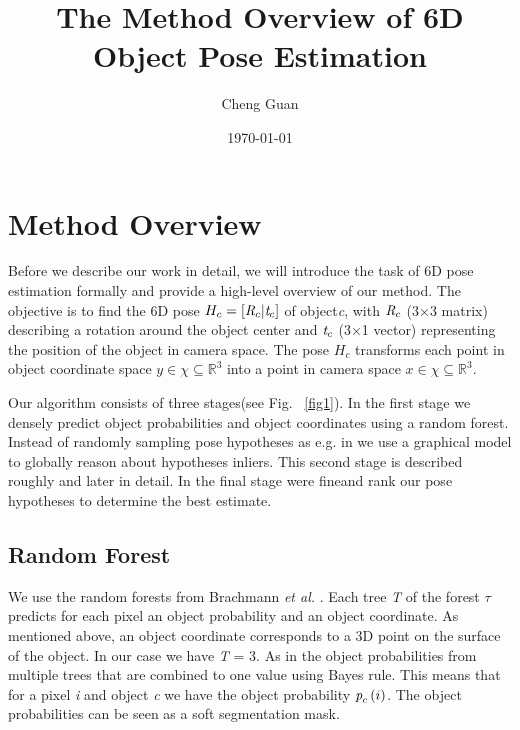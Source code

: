 \documentclass[10pt,twocolumn,a4paper]{article}
\title{The Method Overview of 6D Object Pose Estimation}
\author{Cheng Guan}
\date{\today}
\begin{document}
\maketitle
\section{Method Overview}

Before we describe our work in detail, we will introduce the task
 of 6D pose estimation formally and provide a high-level overview of our method.
 The objective is to ﬁnd the 6D pose $H_c=\left[ \emph{R}_c|\emph{t}_c \right]$ of object\emph{c}, with $\emph{R}_c$ (3$\times$3 matrix)
 describing a rotation around the object center and $\emph{t}_c$ (3×1 vector) representing the
 position of the object in camera space. The pose $H_c$ transforms each point in object
 coordinate space $ y \in \chi \subseteq \mathbb{R}^3$ into a point in camera space $ x \in \chi \subseteq \mathbb{R}^3$.

  Our algorithm consists of three stages(see Fig. ~\ref{fig1}). In the ﬁrst stage we
  densely predict object probabilities and object coordinates using a random forest.
   Instead of randomly sampling pose hypotheses as e.g. in \cite{brachmann2014learning} we use a
   graphical model to globally reason about hypotheses inliers.
   This second stage is described  roughly and later in detail.
   In the ﬁnal stage were ﬁneand rank our pose hypotheses to determine
   the best estimate.
   


   \subsection{Random Forest}
   We use the random forests from Brachmann \emph{et al.} \cite{brachmann2014learning}.
   Each tree \emph{T} of the forest $\tau$ predicts for each pixel an object probability and an object coordinate.
   As mentioned above, an object coordinate corresponds to a 3D point on the surface of the object.
   In our case we have \emph{T} = 3. As in \cite{brachmann2014learning} the object probabilities from multiple trees that are combined
   to one value using Bayes rule. This means that for a pixel \emph{i} and object \emph{c} we have the object
   probability $\emph{p}_c\left(i\right)$. The object probabilities can be seen as a soft segmentation mask.
\end{document}
